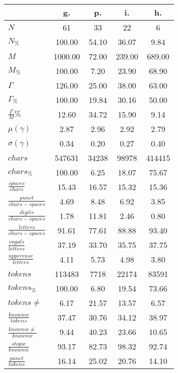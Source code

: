 \begin{table}[h!]
\begin{center}
\begin{tabular}{| l || c | c | c | c |}\hline
 & {\bf g.} & {\bf p.} & {\bf i.} & {\bf h.} \\\hline\hline
$N$ & 61  & 33  & 22  & 6 \\
$N_{\%}$ & 100.00  & 54.10  & 36.07  & 9.84 \\\hline
$M$ & 1000.00  & 72.00  & 239.00  & 689.00 \\
$M_{\%}$ & 100.00  & 7.20  & 23.90  & 68.90 \\\hline
$\Gamma$ & 126.00  & 25.00  & 38.00  & 63.00 \\
$\Gamma_{\%}$ & 100.00  & 19.84  & 30.16  & 50.00 \\\hline
$\frac{\Gamma}{M}\%$ & 12.60  & 34.72  & 15.90  & 9.14 \\
$\mu(\gamma)$ & 2.87  & 2.96  & 2.92  & 2.79 \\
$\sigma(\gamma)$ & 0.34  & 0.20  & 0.27  & 0.40 \\\hline\hline
$chars$ & 547631  & 34238  & 98978  & 414415 \\
$chars_{\%}$ & 100.00  & 6.25  & 18.07  & 75.67 \\\hline
$\frac{spaces}{chars}$ & 15.43  & 16.57  & 15.32  & 15.36 \\
$\frac{punct}{chars-spaces}$ & 4.69  & 8.48  & 6.92  & 3.85 \\
$\frac{digits}{chars-spaces}$ & 1.78  & 11.81  & 2.46  & 0.80 \\\hline
$\frac{letters}{chars-spaces}$ & 91.61  & 77.61  & 88.88  & 93.40 \\
$\frac{vogals}{letters}$ & 37.19  & 33.70  & 35.75  & 37.75 \\
$\frac{uppercase}{letters}$ & 4.11  & 5.73  & 4.98  & 3.80 \\\hline\hline
$tokens$ & 113483  & 7718  & 22174  & 83591 \\
$tokens_{\%}$ & 100.00  & 6.80  & 19.54  & 73.66 \\
$tokens \neq$ & 6.17  & 21.57  & 13.57  & 6.57 \\\hline
$\frac{knownw}{tokens}$ & 37.47  & 30.76  & 34.12  & 38.97 \\
$\frac{knownw \neq}{knownw}$ & 9.44  & 40.23  & 23.66  & 10.65 \\\hline
$\frac{stopw}{knownw}$ & 93.17  & 82.73  & 98.32  & 92.74 \\
$\frac{punct}{tokens}$ & 16.14  & 25.02  & 20.76  & 14.10 \\

\end{tabular}
\end{center}
\end{table}
